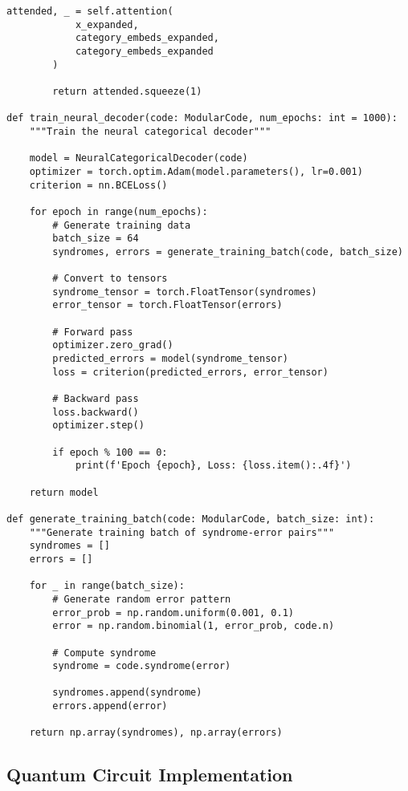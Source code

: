\documentclass[12pt,a4paper]{article}
\begin{document}
\begin{lstlisting}[style=python,caption=Neural categorical decoder implementation]
        attended, _ = self.attention(
            x_expanded,
            category_embeds_expanded,
            category_embeds_expanded
        )
        
        return attended.squeeze(1)

def train_neural_decoder(code: ModularCode, num_epochs: int = 1000):
    """Train the neural categorical decoder"""
    
    model = NeuralCategoricalDecoder(code)
    optimizer = torch.optim.Adam(model.parameters(), lr=0.001)
    criterion = nn.BCELoss()
    
    for epoch in range(num_epochs):
        # Generate training data
        batch_size = 64
        syndromes, errors = generate_training_batch(code, batch_size)
        
        # Convert to tensors
        syndrome_tensor = torch.FloatTensor(syndromes)
        error_tensor = torch.FloatTensor(errors)
        
        # Forward pass
        optimizer.zero_grad()
        predicted_errors = model(syndrome_tensor)
        loss = criterion(predicted_errors, error_tensor)
        
        # Backward pass
        loss.backward()
        optimizer.step()
        
        if epoch % 100 == 0:
            print(f'Epoch {epoch}, Loss: {loss.item():.4f}')
    
    return model

def generate_training_batch(code: ModularCode, batch_size: int):
    """Generate training batch of syndrome-error pairs"""
    syndromes = []
    errors = []
    
    for _ in range(batch_size):
        # Generate random error pattern
        error_prob = np.random.uniform(0.001, 0.1)
        error = np.random.binomial(1, error_prob, code.n)
        
        # Compute syndrome
        syndrome = code.syndrome(error)
        
        syndromes.append(syndrome)
        errors.append(error)
    
    return np.array(syndromes), np.array(errors)
\end{lstlisting}

\subsection{Quantum Circuit Implementation}
\end{document}
